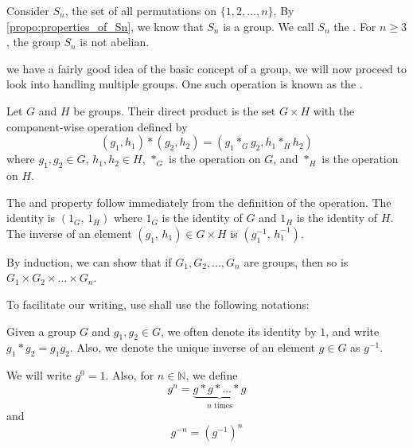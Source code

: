 \begin{eg}
  Consider $S_n$, the set of all permutations on $\{1, 2, ..., n\}$. By \cref{propo:properties_of_Sn}, we know that $S_n$ is a group. We call $S_n$ the  . For $n \geq 3$, the group $S_n$ is not abelian.
\end{eg}

 we have a fairly good idea of the basic concept of a group, we will now proceed to look into handling multiple groups. One such operation is known as the .

\begin{eg}
  \label{eg:direct_product}
  Let $G$ and $H$ be groups. Their direct product is the set $G \times H$ with the component-wise operation defined by
  \begin{equation*}
    (g_1, h_1) * (g_2, h_2) = (g_1 *_G g_2, h_1 *_H h_2)
  \end{equation*}
  where $g_1, g_2 \in G$, $h_1, h_2 \in H$, $*_G$ is the operation on $G$, and $*_H$ is the operation on $H$.

  The  and  property follow immediately from the definition of the operation. The identity is $(1_G, \, 1_H)$ where $1_G$ is the identity of $G$ and $1_H$ is the identity of $H$. The inverse of an element $(g_1, \, h_1) \in G \times H$ is $(g_1^{-1}, \, h_1^{-1})$.
\end{eg}

By induction, we can show that if $G_1, G_2, ..., G_n$ are groups, then so is $G_1 \times G_2 \times \hdots \times G_n$.

To facilitate our writing, use shall use the following notations:

\begin{notation}
  Given a group $G$ and $g_1, g_2 \in G$, we often denote its identity by $1$, and write $g_1 * g_2 = g_1 g_2$. Also, we denote the unique inverse of an element $g \in G$ as $g^{-1}$.

  We will write $g^0 = 1$. Also, for $n \in \mathbb{N}$, we define
  \begin{equation*}
     g^n = \underbrace{g * g * \hdots * g}_{n \text{ times}}
  \end{equation*}
  and
  \begin{equation*}
    g^{-n} = (g^{-1})^n
  \end{equation*}
\end{notation}

